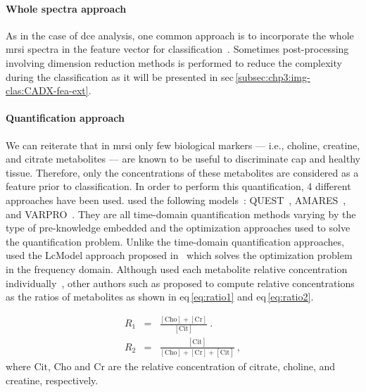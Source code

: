 \paragraph{Whole spectra approach}
As in the case of \ac{dce} analysis, one common approach is to incorporate the whole \ac{mrsi} spectra in the feature vector for classification~\cite{Kelm2007,Parfait2012,Tiwari2007,Tiwari2009,Tiwari2013,Tiwari2009a,Tiwari2010,Viswanath2008a,Matulewicz2013,trigui2016classification,trigui2017automatic}.
Sometimes post-processing involving dimension reduction methods is performed to reduce the complexity during the classification as it will be presented in \acs{sec}\,\ref{subsec:chp3:img-clas:CADX-fea-ext}.

\paragraph{Quantification approach}
We can reiterate that in \ac{mrsi} only few biological markers --- i.e., choline, creatine, and citrate metabolites --- are known to be useful to discriminate \ac{cap} and healthy tissue.
Therefore, only the concentrations of these metabolites are considered as a feature prior to classification.
In order to perform this quantification, 4 different approaches have been used.
\citeauthor{Kelm2007} used the following models~\cite{Kelm2007}: QUEST~\cite{Ratiney2005}, AMARES~\cite{Vanhamme1997}, and VARPRO~\cite{Coleman1993}.
They are all time-domain quantification methods varying by the type of pre-knowledge embedded and the optimization approaches used to solve the quantification problem.
Unlike the time-domain quantification approaches, \citeauthor{Parfait2012} used the LcModel approach proposed in~\cite{Provencher1993} which solves the optimization problem in the frequency domain.
Although \citeauthor{Parfait2012} used each metabolite relative concentration individually~\cite{Parfait2012}, other authors such as \citeauthor{Kelm2007} proposed to compute relative concentrations as the ratios of metabolites as shown in \acs{eq}\,\ref{eq:ratio1} and \acs{eq}\,\ref{eq:ratio2}.

\begin{eqnarray}
	R_1 & = & \frac{ [ \text{Cho} ] + [ \text{Cr} ]}{[ \text{Cit} ]} \ . \label{eq:ratio1} \\
	R_2 & = & \frac{[ \text{Cit} ]}{[\text{Cho}]+[\text{Cr}]+[\text{Cit}]} \ , \label{eq:ratio2}
\end{eqnarray}
\noindent where $\text{Cit}$, $\text{Cho}$ and $\text{Cr}$ are the relative concentration of citrate, choline, and creatine, respectively.

